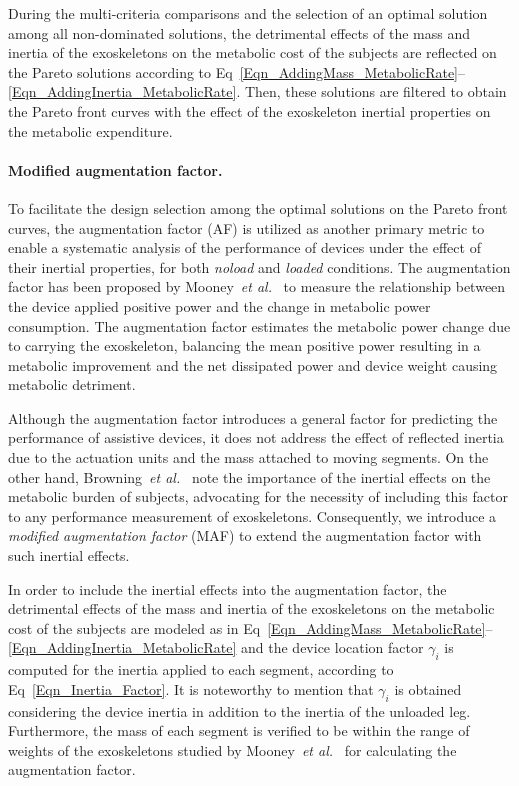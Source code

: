 \documentclass[10pt,letterpaper]{article}
\newcommand{\etal}{\textit{et al.}}
\begin{document}
During the multi-criteria comparisons and the selection of an optimal solution among all non-dominated solutions, the detrimental effects of the mass and inertia of the exoskeletons on the metabolic cost of the subjects are reflected on the Pareto solutions according to  Eq~\eqref{Eqn_AddingMass_MetabolicRate}--\eqref{Eqn_AddingInertia_MetabolicRate}. Then, these solutions are filtered to obtain the Pareto front curves with the effect of the exoskeleton inertial properties on the metabolic expenditure.

\paragraph*{Modified augmentation factor.}

To facilitate the design selection among the optimal solutions on the Pareto front curves, the augmentation factor (AF) is utilized as another primary metric to enable a systematic analysis of the performance of devices under the effect of their inertial properties, for both {\it noload} and {\it loaded} conditions. The augmentation factor has been proposed by Mooney~\etal~\cite{Mooney2014_a}  to measure the relationship between the device applied positive power and the change in metabolic power consumption. The augmentation factor  estimates the metabolic power change due to carrying the exoskeleton, balancing the mean positive power resulting in a metabolic improvement and the net dissipated power and device weight causing metabolic detriment.

Although the augmentation factor introduces a general factor for predicting the performance of assistive devices, it does not address the effect of reflected inertia due to the actuation units and  the mass attached to moving segments. On the other hand, Browning~\etal~\cite{Browning2007} note the importance of the inertial effects on the metabolic burden of subjects, advocating for the necessity of including this factor to any performance measurement of exoskeletons. Consequently, we introduce a \emph{modified augmentation factor} (MAF) to extend the augmentation factor with such inertial effects.

In order to include the inertial effects into the augmentation factor, the detrimental effects of the mass and inertia of the exoskeletons on the metabolic cost of the subjects are modeled as in Eq~\eqref{Eqn_AddingMass_MetabolicRate}--\eqref{Eqn_AddingInertia_MetabolicRate} and
the device location factor $\gamma_{i}$ is computed for the inertia applied to each segment, according to Eq~\eqref{Eqn_Inertia_Factor}. It is noteworthy to mention that $\gamma_{i}$ is obtained considering the device inertia in addition to the inertia of the unloaded leg. Furthermore, the mass of each segment is verified to be within the range of weights of the exoskeletons studied by Mooney~\etal~\cite{Mooney2014_a} for calculating the augmentation factor.
\end{document}

